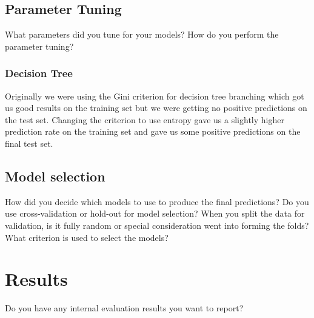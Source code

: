 \documentclass[11pt,a4paper]{article}
\begin{document}
\subsection{Parameter Tuning}
What parameters did you tune for your models? How do you perform the parameter tuning?

\subsubsection{Decision Tree}
Originally we were using the Gini criterion for decision tree branching which got us good results on the training set but we were getting no positive predictions on the test set.
Changing the criterion to use entropy gave us a slightly higher prediction rate on the training set and gave us some positive predictions on the final test set.

\subsection{Model selection}
How did you decide which models to use to produce the final predictions?  Do you use cross-validation or hold-out for model selection? When you split the data for validation, is it fully random or special consideration went into forming the folds? What criterion is used to select the models?

\section{Results}
Do you have any internal evaluation results you want to report?
\end{document}
